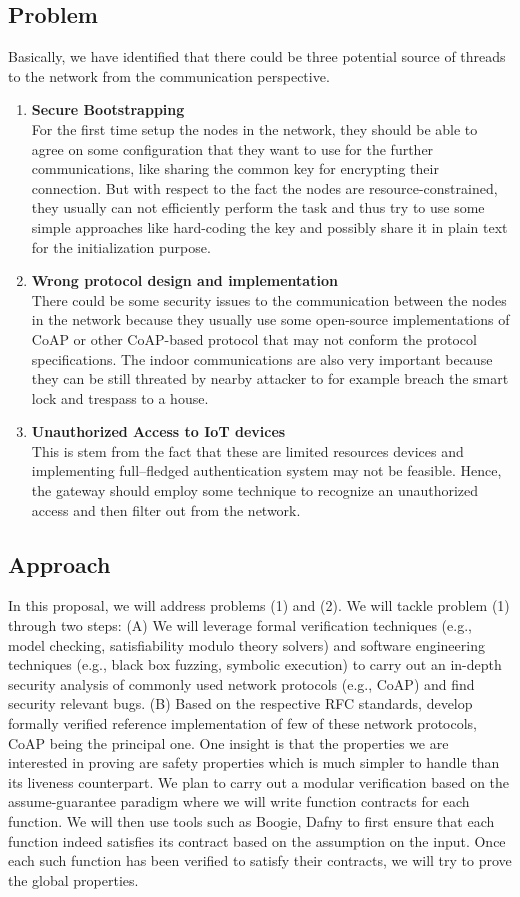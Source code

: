 \documentclass[10pt,a4paper]{article}
\begin{document}
\subsection*{Problem} 
Basically, we have identified that there could be three potential source of threads to the network from the communication perspective.
\begin{enumerate}
\item \textbf{Secure Bootstrapping} \\ \indent For the first time  setup the nodes in the network, they should be able to agree on some configuration that they want to use for the further communications, like sharing the common key for encrypting their connection. But with respect to the fact the nodes are resource-constrained, they usually can not efficiently perform the task and thus try to use some simple approaches like hard-coding the key and possibly share it in plain text for the initialization purpose. 
\item \textbf{Wrong protocol design and implementation} \\ \indent There could be some security issues to the communication between the nodes in the network because they usually use some open-source implementations of CoAP or other CoAP-based protocol that may not conform the protocol specifications. The indoor communications are also very important because they can be still threated by nearby attacker to for example breach the smart lock and trespass to a house. 
\item \textbf{Unauthorized Access to IoT devices} \\  
This is stem from the fact that these are limited resources devices and implementing full–fledged authentication system may not be feasible. Hence, the gateway should employ some technique to recognize an unauthorized access and then filter out from the network. 
\end{enumerate}

\subsection*{Approach} 
In this proposal, we will address problems (1) and (2). 
We will tackle problem (1) through two steps: (A) We will leverage formal verification techniques (e.g., model checking, satisfiability modulo theory solvers) and software engineering techniques (e.g., black box fuzzing, symbolic execution) to carry out an in-depth security analysis of commonly used network protocols (e.g., CoAP) and find security relevant bugs. (B) Based on the respective RFC standards, develop formally verified reference implementation of few of these network protocols, CoAP being the principal one. One insight is that the properties we are interested in proving are safety properties which is much simpler to handle 
than its liveness counterpart. We plan to carry out a modular verification based on the assume-guarantee paradigm where we will write function contracts for each function. We will then use tools such as Boogie, Dafny to first  ensure that each function indeed satisfies its contract based on the assumption on the input. Once each such function has been verified to satisfy their contracts, we will try to prove the global properties. 
\end{document}

